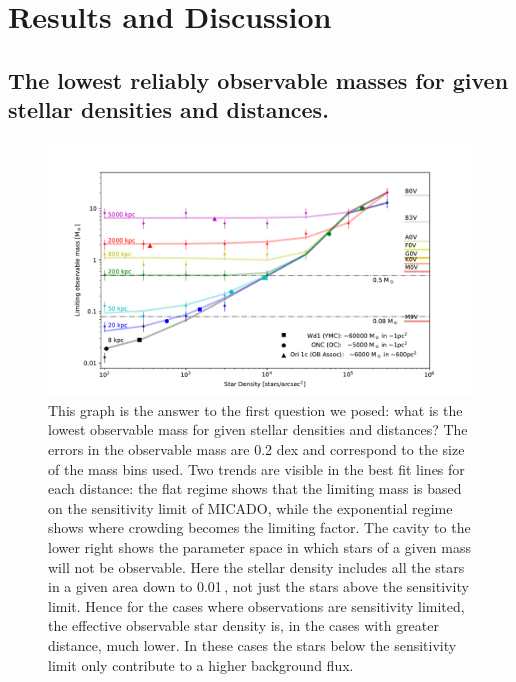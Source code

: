 \section{Results and Discussion}
\label{sec:results}

\subsection{The lowest reliably observable masses for given stellar densities
and distances.}

\begin{figure}

    \centering
    \includegraphics[width=\textwidth]{images/old_trusted_mass.pdf}

    \caption{This graph is the answer to the first question we posed: what is the lowest observable mass for given stellar densities and distances? 
    The errors in the observable mass are 0.2 dex and correspond to the size of the mass bins used. 
    Two trends are visible in the best fit lines for each distance: the flat regime shows that the limiting mass is based on the sensitivity limit of MICADO, while the exponential regime shows where crowding becomes the limiting factor. 
    The cavity to the lower right shows the parameter space in which stars of a given mass will not be observable.
    Here the stellar density includes all the stars in a given area down to 0.01\,\msun, not just the stars above the sensitivity limit. 
    Hence for the cases where observations are sensitivity limited, the effective observable star density is, in the cases with greater distance, much lower. 
    In these cases the stars below the sensitivity limit only contribute to a higher background flux.}
    
    \label{fig:trusted_mass}
    
\end{figure}

